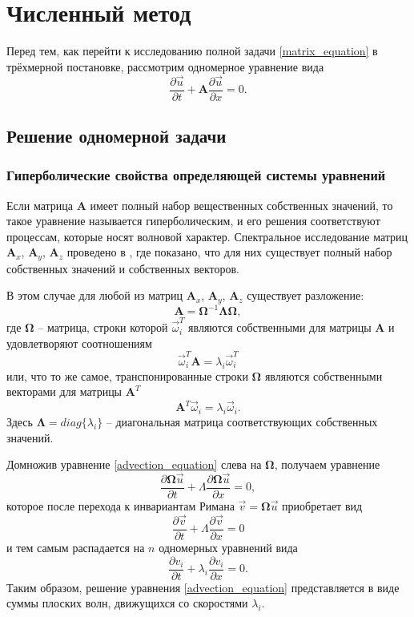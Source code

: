 \section{Численный метод}

Перед тем, как перейти к исследованию полной задачи \ref{matrix_equation} в трёхмерной постановке, рассмотрим одномерное уравнение вида
\begin{equation}
\frac{\partial\vec{u}}{\partial{t}}+\mathbf{A}\frac{\partial\vec{u}}{\partial{x}}=0.
\label{advection_equation}
\end{equation}

\subsection{Решение одномерной задачи}

\subsubsection{Гиперболические свойства определяющей системы уравнений}

Если матрица $\mathbf{A}$ имеет полный набор вещественных собственных значений, 
то такое уравнение называется гиперболическим, и его решения соответствуют 
процессам, которые носят волновой характер. Спектральное исследование матриц $\mathbf{A}_x$, $\mathbf{A}_y$, $\mathbf{A}_z$ проведено в \cite{chelnokov}, где показано, что для них существует полный набор собственных значений и собственных векторов.

В этом случае для любой из матриц $\mathbf{A}_x$, $\mathbf{A}_y$, $\mathbf{A}_z$ существует разложение:
$$\mathbf{A}=\mathbf\Omega^{-1}\mathbf\Lambda\mathbf\Omega,$$
где $\mathbf\Omega$ -- матрица, строки которой $\vec\omega_i^T$ являются собственными для матрицы $\mathbf A$ и
удовлетворяют соотношениям
$$\vec\omega_i^T\mathbf A=\lambda_i\vec\omega_i^T$$ или, что то же самое, транспонированные строки $\mathbf\Omega$ являются собственными векторами для матрицы $\mathbf A^T$
$$\mathbf A^T\vec\omega_i=\lambda_i\vec\omega_i.$$
Здесь $\mathbf\Lambda=diag\{\lambda_i\}$ -- диагональная матрица соответствующих собственных значений.

Домножив уравнение \ref{advection_equation} слева на $\mathbf\Omega$, получаем уравнение
$$\frac{\partial{\mathbf\Omega{\vec u}}}{\partial t}+
\Lambda\frac{\partial{\mathbf\Omega{\vec u}}}{\partial x}=0,$$
которое после перехода к инвариантам Римана ${\vec v}=\mathbf\Omega{\vec u}$ приобретает вид
$$\frac{\partial{\vec v}}{\partial t}+
\Lambda\frac{\partial{\vec v}}{\partial x}=0$$
и тем самым распадается на $n$ одномерных уравнений вида
\begin{equation}
\frac{\partial{v_i}}{\partial t}+\lambda_i\frac{\partial{v_i}}{\partial x}=0.
\label{advection_equation_splitted}
\end{equation}
Таким образом, решение уравнения \ref{advection_equation} представляется в виде
суммы плоских волн, движущихся со скоростями $\lambda_i$.


